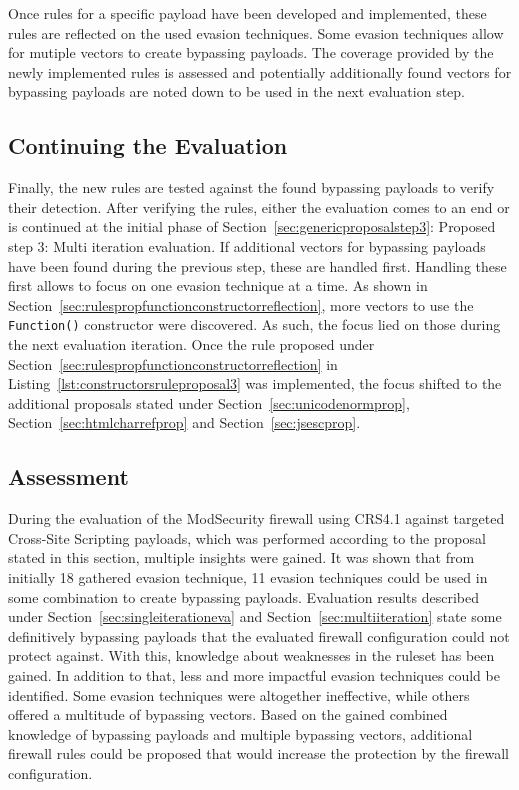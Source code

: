 Once rules for a specific payload have been developed and implemented, these rules are reflected on the used evasion techniques. Some evasion techniques allow for mutiple vectors to create bypassing payloads. The coverage provided by the newly implemented rules is assessed and potentially additionally found vectors for bypassing payloads are noted down to be used in the next evaluation step. 
\subsection{Continuing the Evaluation}
Finally, the new rules are tested against the found bypassing payloads to verify their detection. After verifying the rules, either the evaluation comes to an end or is continued at the initial phase of Section~\ref{sec:genericproposalstep3}: Proposed step 3: Multi iteration evaluation. If additional vectors for bypassing payloads have been found during the previous step, these are handled first. Handling these first allows to focus on one evasion technique at a time. As shown in Section~\ref{sec:rulespropfunctionconstructorreflection}, more vectors to use the \verb|Function()| constructor were discovered. As such, the focus lied on those during the next evaluation iteration. Once the rule proposed under Section~\ref{sec:rulespropfunctionconstructorreflection} in Listing~\ref{lst:constructorsruleproposal3} was implemented, the focus shifted to the additional proposals stated under Section~\ref{sec:unicodenormprop}, Section~\ref{sec:htmlcharrefprop} and Section~\ref{sec:jsescprop}.

\subsection{Assessment} 
During the evaluation of the ModSecurity firewall using CRS4.1 against targeted Cross-Site Scripting payloads, which was performed according to the proposal stated in this section, multiple insights were gained. It was shown that from initially 18 gathered evasion technique, 11 evasion techniques could be used in some combination to create bypassing payloads. Evaluation results described under Section~\ref{sec:singleiterationeva} and Section~\ref{sec:multiiteration} state some definitively bypassing payloads that the evaluated firewall configuration could not protect against. With this, knowledge about weaknesses in the ruleset has been gained. In addition to that, less and more impactful evasion techniques could be identified. Some evasion techniques were altogether ineffective, while others offered a multitude of bypassing vectors. Based on the gained combined knowledge of bypassing payloads and multiple bypassing vectors, additional firewall rules could be proposed that would increase the protection by the firewall configuration.

